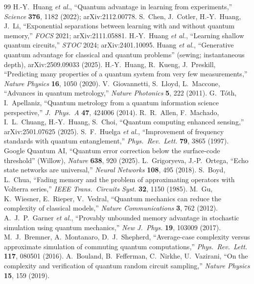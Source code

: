 \documentclass[11pt]{article}
\theoremstyle{plain}
\theoremstyle{definition}
\theoremstyle{remark}
\begin{document}
\begin{thebibliography}{99}
 H.-Y.\ Huang \emph{et al.}, ``Quantum advantage in learning from experiments,'' \emph{Science} \textbf{376}, 1182 (2022); arXiv:2112.00778.
 S.\ Chen, J.\ Cotler, H.-Y.\ Huang, J.\ Li, ``Exponential separations between learning with and without quantum memory,'' \emph{FOCS} 2021; arXiv:2111.05881.
 H.-Y.\ Huang \emph{et al.}, ``Learning shallow quantum circuits,'' \emph{STOC} 2024; arXiv:2401.10095.
 Huang \emph{et al.}, ``Generative quantum advantage for classical and quantum problems'' (sewing; instantaneous depth), arXiv:2509.09033 (2025).
 H.-Y.\ Huang, R.\ Kueng, J.\ Preskill, ``Predicting many properties of a quantum system from very few measurements,'' \emph{Nature Physics} \textbf{16}, 1050 (2020).
 V.\ Giovannetti, S.\ Lloyd, L.\ Maccone, ``Advances in quantum metrology,'' \emph{Nature Photonics} \textbf{5}, 222 (2011).
 G.\ T\'oth, I.\ Apellaniz, ``Quantum metrology from a quantum information science perspective,'' \emph{J.\ Phys.\ A} \textbf{47}, 424006 (2014).
 R.\ R.\ Allen, F.\ Machado, I.\ L.\ Chuang, H.-Y.\ Huang, S.\ Choi, ``Quantum computing enhanced sensing,'' arXiv:2501.07625 (2025).
 S.\ F.\ Huelga \emph{et al.}, ``Improvement of frequency standards with quantum entanglement,'' \emph{Phys.\ Rev.\ Lett.} \textbf{79}, 3865 (1997).
 Google Quantum AI, ``Quantum error correction below the surface-code threshold'' (Willow), \emph{Nature} \textbf{638}, 920 (2025).
 L.\ Grigoryeva, J.-P.\ Ortega, ``Echo state networks are universal,'' \emph{Neural Networks} \textbf{108}, 495 (2018).
 S.\ Boyd, L.\ Chua, ``Fading memory and the problem of approximating operators with Volterra series,'' \emph{IEEE Trans.\ Circuits Syst.} \textbf{32}, 1150 (1985).
 M.\ Gu, K.\ Wiesner, E.\ Rieper, V.\ Vedral, ``Quantum mechanics can reduce the complexity of classical models,'' \emph{Nature Communications} \textbf{3}, 762 (2012).
 A.\ J.\ P.\ Garner \emph{et al.}, ``Provably unbounded memory advantage in stochastic simulation using quantum mechanics,'' \emph{New J.\ Phys.} \textbf{19}, 103009 (2017).
 M.\ J.\ Bremner, A.\ Montanaro, D.\ J.\ Shepherd, ``Average-case complexity versus approximate simulation of commuting quantum computations,'' \emph{Phys.\ Rev.\ Lett.} \textbf{117}, 080501 (2016).
 A.\ Bouland, B.\ Fefferman, C.\ Nirkhe, U.\ Vazirani, ``On the complexity and verification of quantum random circuit sampling,'' \emph{Nature Physics} \textbf{15}, 159 (2019).
\end{thebibliography}
\end{document}
